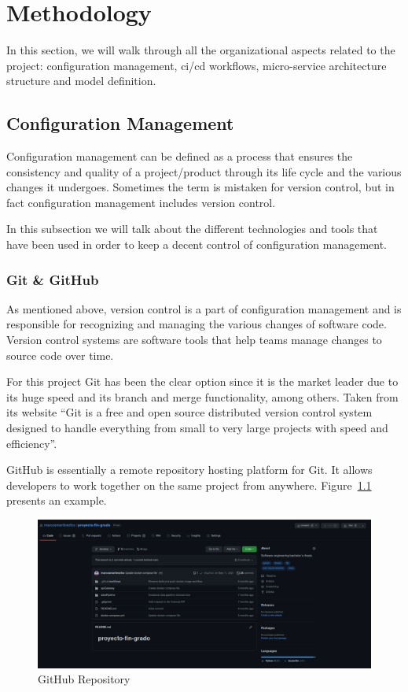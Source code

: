 \chapter{Methodology}
\label{mt:methodology}

In this section, we will walk through all the organizational aspects related to the project: configuration management, \gls{ci}/\gls{cd} workflows, micro-service architecture structure and model definition.

\section{Configuration Management}

Configuration management can be defined as a process that ensures the consistency and quality of a project/product through its life cycle and the various changes it undergoes. Sometimes the term is mistaken for version control, but in fact configuration management includes version control.

In this subsection we will talk about the different technologies and tools that have been used in order to keep a decent control of configuration management.

\subsection{Git \& GitHub}

As mentioned above, version control is a part of configuration management and is responsible for recognizing and managing the various changes of software code. Version control systems are software tools that help teams manage changes to source code over time. 

For this project Git has been the clear option since it is the market leader due to its huge speed and its branch and merge functionality, among others. Taken from its website \enquote{Git is a free and open source distributed version control system designed to handle everything from small to very large projects with speed and efficiency}.~\cite{gitDefinition}

GitHub is essentially a remote repository hosting platform for Git. It allows developers to work together on the same project from anywhere. Figure~\ref{fig:current-status-github} presents an example.

\begin{figure}[H]
    \centering
    \includegraphics[width=\textwidth]{figures/github.png}
    \caption{GitHub Repository}
    \label{fig:current-status-github}
\end{figure}


